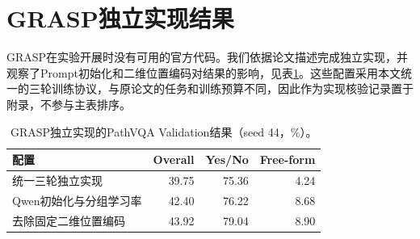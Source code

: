 \section{GRASP独立实现结果}
\label{sec:grasp-appendix}

GRASP在实验开展时没有可用的官方代码。我们依据论文描述完成独立实现，并观察了Prompt初始化和二维位置编码对结果的影响，见表\ref{tab:grasp-appendix}。这些配置采用本文统一的三轮训练协议，与原论文的任务和训练预算不同，因此作为实现核验记录置于附录，不参与主表排序。

\begin{table}[t]
    \centering
    \caption{GRASP独立实现的PathVQA Validation结果（seed 44，\%）。}
    \label{tab:grasp-appendix}
    \small
    \begin{tabular}{@{}lrrr@{}}
        \toprule
        配置 & Overall & Yes/No & Free-form \\
        \midrule
        统一三轮独立实现 & 39.75 & 75.36 & 4.24 \\
        Qwen初始化与分组学习率 & 42.40 & 76.22 & 8.68 \\
        去除固定二维位置编码 & 43.92 & 79.04 & 8.90 \\
        \bottomrule
    \end{tabular}
\end{table}
